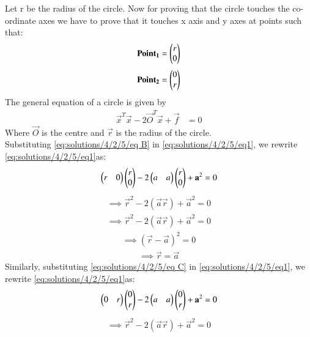 Let r be the radius of the circle. Now for proving that the circle touches the co-ordinate axes we have to prove that it touches x axis and y axes at points such that:
\begin{align}
\mathbf{Point_{1}} = \begin{pmatrix} r \\ 0 \\\end{pmatrix}\label{eq:solutions/4/2/5/eq B}
\end{align}
\begin{align}
\mathbf{Point_{2}} = \begin{pmatrix} 0 \\ r \\\end{pmatrix} \label{eq:solutions/4/2/5/eq C}
\end{align}
The general equation of a circle is given by
\begin{align}
\vec{x}^T\vec{x} - 2\vec{O}^T\vec{x} + \vec{f}  &= 0 \label{eq:solutions/4/2/5/eq 2}
\end{align}
Where $\vec{O}$ is the centre and $\vec{r}$ is the radius of the circle.\\
Substituting \eqref{eq:solutions/4/2/5/eq B} in \eqref{eq:solutions/4/2/5/eq1}, we rewrite \eqref{eq:solutions/4/2/5/eq1}as:
\begin{align}
\begin{pmatrix}r&0\end{pmatrix}\begin{pmatrix}r\\0\end{pmatrix}-2\begin{pmatrix}a & a\end{pmatrix}\begin{pmatrix}r\\0\end{pmatrix}+\mathbf{a}^2 = 0 \label{eq:solutions/4/2/5/eq3}
\end{align}
\begin {align}
\implies\vec{r}^2 -2\left(\vec{a}\vec{r}\right)+\vec{a}^2=0
\end{align}
\begin {align}
\implies\vec{r}^2 -2\left(\vec{a}\vec{r}\right)+\vec{a}^2=0
\end{align}
\begin {align}
\implies\left(\vec{r}- \vec{a}\right)^2=0
\end{align}
\begin{align}
\implies\vec{r}= \vec{a}
\end{align}
Similarly, substituting \eqref{eq:solutions/4/2/5/eq C} in \eqref{eq:solutions/4/2/5/eq1}, we rewrite \eqref{eq:solutions/4/2/5/eq1}as:
\begin{align}
\begin{pmatrix}0&r\end{pmatrix}\begin{pmatrix}0\\r\end{pmatrix}-2\begin{pmatrix}a & a\end{pmatrix}\begin{pmatrix}0\\r\end{pmatrix}+\mathbf{a}^2 = 0 
\end{align}
\begin {align}
\implies\vec{r}^2 -2\left(\vec{a}\vec{r}\right)+\vec{a}^2=0
\end{align}
